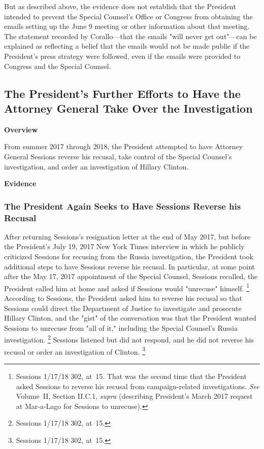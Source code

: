 {But as described above, the evidence does not establish that the President intended to prevent the Special Counsel's Office or Congress from obtaining the emails setting up the June 9 meeting or other information about that meeting.
The statement recorded by Corallo---that the emails "will never get out"---can be explained as reflecting a belief that the emails would not be made public if the President's press strategy were followed, even if the emails were provided to Congress and the Special Counsel.

\subsection{The President's Further Efforts to Have the Attorney General Take Over the Investigation}

\begin{center}
\textbf{Overview}
\end{center}

From summer 2017 through 2018, the President attempted to have Attorney General Sessions reverse his recusal, take control of the Special Counsel's investigation, and order an investigation of Hillary Clinton.

\begin{center}
\textbf{Evidence}
\end{center}

\subsubsection{The President Again Seeks to Have Sessions Reverse his Recusal}

After returning Sessions's resignation letter at the end of May 2017, but before the President's July 19, 2017 New York Times interview in which he publicly criticized Sessions for recusing from the Russia investigation, the President took additional steps to have Sessions reverse his recusal.
In particular, at some point after the May 17, 2017 appointment of the Special Counsel, Sessions recalled, the President called him at home and asked if Sessions would "unrecuse" himself.%
\footnote{Sessions 1/17/18 302, at~15.
That was the second time that the President asked Sessions to reverse his recusal from campaign-related investigations.
\textit{See} Volume~II, Section II.C.1, \textit{supra} (describing President's March 2017 request at Mar-a-Lago for Sessions to unrecuse).
}
According to Sessions, the President asked him to reverse his recusal so that Sessions could direct the Department of Justice to investigate and prosecute Hillary Clinton, and the "gist" of the conversation was that the President wanted Sessions to unrecuse from "all of it," including the Special Counsel's Russia investigation.%
\footnote{Sessions 1/17/18 302, at~15.}
Sessions listened but did not respond, and he did not reverse his recusal or order an investigation of Clinton.%
\footnote{Sessions 1/17/18 302, at~15.}

}
